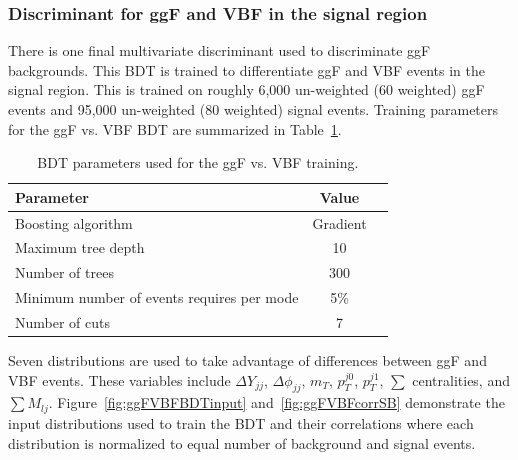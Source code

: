 \subsubsection{Discriminant for ggF and VBF in the signal region}
There is one final multivariate discriminant used to discriminate ggF backgrounds. This BDT is trained to differentiate ggF and VBF events in the signal region. This is trained on roughly 6,000 un-weighted (60 weighted) ggF events and 95,000 un-weighted (80 weighted) signal events. Training parameters for the ggF vs. VBF BDT are summarized in Table~\ref{tab:ggFVBFBDTparameters}.
\begin{table}[h!]
\centering
\begin{tabular}{|l|c|c|}
\hline
Parameter                                    & Value     \\
\hline
Boosting algorithm                           & Gradient \\
Maximum tree depth                           &  10      \\
Number of trees                              &  300    \\
Minimum number of events requires per mode   &  5\%     \\
Number of cuts                               &  7       \\
\hline
\end{tabular}
\caption{BDT parameters used for the ggF vs. VBF training.}
\label{tab:ggFVBFBDTparameters}
\end{table}

Seven distributions are used to take advantage of differences between ggF and VBF events. These variables include $\Delta Y_{jj}$, $\Delta \phi_{jj}$, $m_T$, $p_T^{j0}$, $p_T^{j1}$, $\sum$ centralities, and $\sum M_{lj}$. Figure~\ref{fig:ggFVBFBDTinput} and~\ref{fig:ggFVBFcorrSB} demonstrate the input distributions used to train the BDT and their correlations where each distribution is normalized to equal number of background and signal events.


